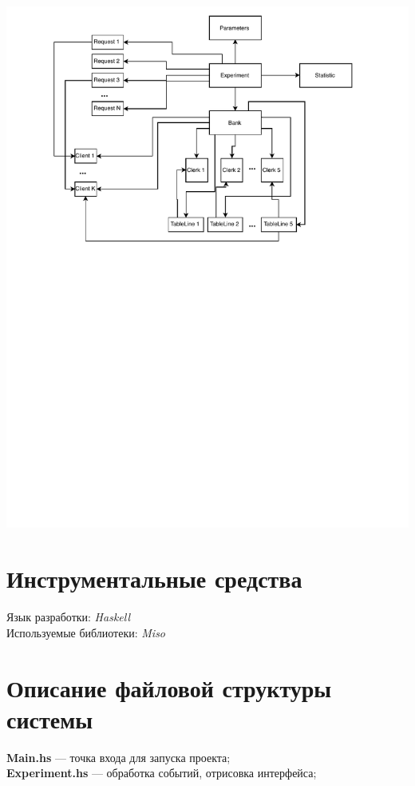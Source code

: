 \documentclass[oneside,final,12pt]{article}
\begin{document}
\begin{center}
\includegraphics[width=180mm]{objects.pdf}
\end{center}
\newpage

\section{Инструментальные средства}
Язык разработки: \textit{Haskell}\\

Используемые библиотеки: \textit{Miso}

\section{Описание файловой структуры системы}
\textbf{Main.hs} --- точка входа для запуска проекта;\\

\textbf{Experiment.hs} --- обработка событий, отрисовка интерфейса;\\
\end{document}
